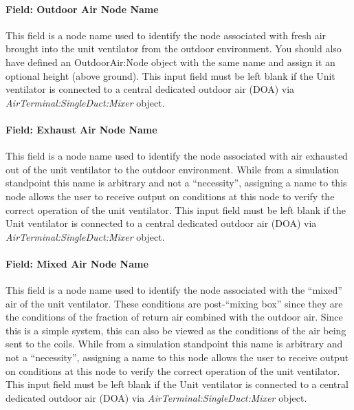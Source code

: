 \paragraph{Field: Outdoor Air Node Name}\label{field-outdoor-air-node-name-001}

This field is a node name used to identify the node associated with fresh air brought into the unit ventilator from the outdoor environment. You should also have defined an OutdoorAir:Node object with the same name and assign it an optional height (above ground). This input field must be left blank if the Unit ventilator is connected to a central dedicated outdoor air (DOA) via \textit{AirTerminal:SingleDuct:Mixer} object.

\paragraph{Field: Exhaust Air Node Name}\label{field-exhaust-air-node-name-000}

This field is a node name used to identify the node associated with air exhausted out of the unit ventilator to the outdoor environment. While from a simulation standpoint this name is arbitrary and not a ``necessity'', assigning a name to this node allows the user to receive output on conditions at this node to verify the correct operation of the unit ventilator. This input field must be left blank if the Unit ventilator is connected to a central dedicated outdoor air (DOA) via \textit{AirTerminal:SingleDuct:Mixer} object.

\paragraph{Field: Mixed Air Node Name}\label{field-mixed-air-node-name-001}

This field is a node name used to identify the node associated with the ``mixed'' air of the unit ventilator. These conditions are post-``mixing box'' since they are the conditions of the fraction of return air combined with the outdoor air. Since this is a simple system, this can also be viewed as the conditions of the air being sent to the coils. While from a simulation standpoint this name is arbitrary and not a ``necessity'', assigning a name to this node allows the user to receive output on conditions at this node to verify the correct operation of the unit ventilator. This input field must be left blank if the Unit ventilator is connected to a central dedicated outdoor air (DOA) via \textit{AirTerminal:SingleDuct:Mixer} object.

